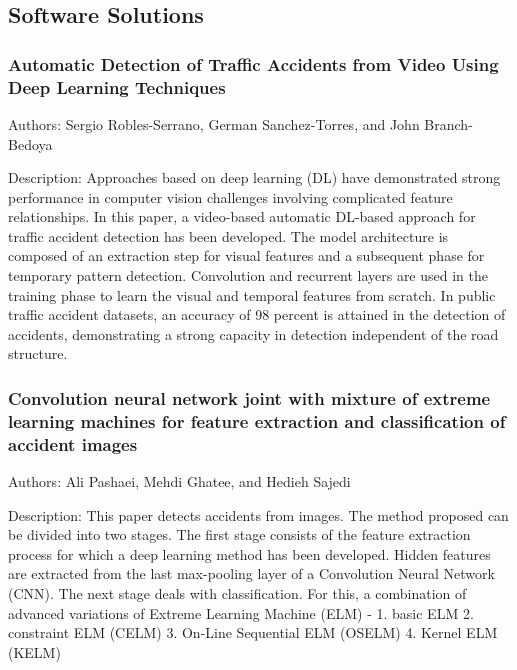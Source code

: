 \documentclass[ 12pt,a4paper,twocolumn,fleqn]{article}
\begin{document}
\begin{adjustwidth}{3.5em}{0pt}
\hspace{0.2cm}

\subsection{Software Solutions}

\subsubsection{Automatic Detection of Traffic Accidents from Video Using Deep Learning Techniques}

Authors: Sergio Robles-Serrano, German Sanchez-Torres, and John Branch-Bedoya

Description:  Approaches based on deep learning (DL) have demonstrated strong performance in computer vision challenges involving complicated feature relationships. In this paper, a video-based automatic DL-based approach for traffic accident detection has been developed. The model architecture is composed of an extraction step for visual features and a subsequent phase for temporary pattern detection. Convolution and recurrent layers are used in the training phase to learn the visual and temporal features from scratch. In public traffic accident datasets, an accuracy of 98 percent is attained in the detection of accidents, demonstrating a strong capacity in detection independent of the road structure.


\hspace{0.2cm}

\subsubsection{Convolution neural network joint with mixture of extreme learning machines for feature extraction and classification of accident images}

Authors: Ali Pashaei, Mehdi Ghatee, and Hedieh Sajedi

Description: This paper detects accidents from images. The method proposed can be divided into two stages. The first stage consists of the feature extraction process for which a deep learning method has been developed. Hidden features are extracted from the last max-pooling layer of a Convolution Neural Network (CNN). The next stage deals with classification. For this, a combination of advanced variations of Extreme Learning Machine (ELM) -
1. basic ELM
2. constraint ELM (CELM)
3. On-Line Sequential ELM (OSELM) 
4. Kernel ELM (KELM)



\end{adjustwidth}
\end{document}
